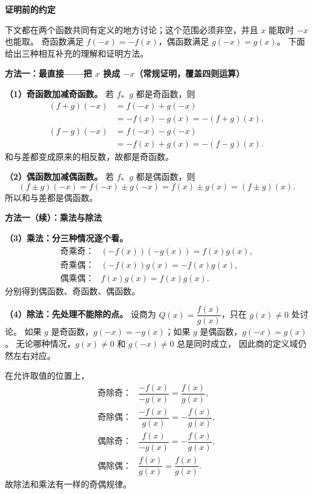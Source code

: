 \clearpage
\begin{proofbox}
\textbf{\textcolor{CProof}{证明前的约定}}

下文都在两个函数共同有定义的地方讨论；这个范围必须非空，并且 $x$ 能取时 $-x$ 也能取。
奇函数满足 $f(-x)=-f(x)$，偶函数满足 $g(-x)=g(x)$。
下面给出三种相互补充的理解和证明方法。

\medskip
\textbf{\textcolor{CProof}{方法一：最直接——把 $x$ 换成 $-x$（常规证明，覆盖四则运算）}}



\textbf{（1）奇函数加减奇函数。}
若 $f$、$g$ 都是奇函数，则
\[
\begin{aligned}
(f+g)(-x)&=f(-x)+g(-x)\\
&=-f(x)-g(x)=-(f+g)(x),\\[1mm]
(f-g)(-x)&=f(-x)-g(-x)\\
&=-f(x)+g(x)=-(f-g)(x).
\end{aligned}
\]
和与差都变成原来的相反数，故都是奇函数。

\textbf{（2）偶函数加减偶函数。}
若 $f$、$g$ 都是偶函数，则
\[
(f\pm g)(-x)=f(-x)\pm g(-x)=f(x)\pm g(x)=(f\pm g)(x).
\]
所以和与差都是偶函数。

\end{proofbox}\clearpage\begin{proofbox}\textbf{方法一（续）：乘法与除法}

\textbf{（3）乘法：分三种情况逐个看。}
\[
\begin{array}{ll}
\text{奇乘奇：}&(-f(x))(-g(x))=f(x)g(x),\\[2mm]
\text{奇乘偶：}&(-f(x))g(x)=-f(x)g(x),\\[2mm]
\text{偶乘偶：}&f(x)g(x)=f(x)g(x).
\end{array}
\]
分别得到偶函数、奇函数、偶函数。

\textbf{（4）除法：先处理不能除的点。}
设商为 $Q(x)=\dfrac{f(x)}{g(x)}$，只在 $g(x)\ne0$ 处讨论。
如果 $g$ 是奇函数，$g(-x)=-g(x)$；如果 $g$ 是偶函数，$g(-x)=g(x)$。
无论哪种情况，$g(x)\ne0$ 和 $g(-x)\ne0$ 总是同时成立，
因此商的定义域仍然左右对应。

在允许取值的位置上，
\[
\begin{array}{ll}
\text{奇除奇：}&\dfrac{-f(x)}{-g(x)}=\dfrac{f(x)}{g(x)},\\[3mm]
\text{奇除偶：}&\dfrac{-f(x)}{g(x)}=-\dfrac{f(x)}{g(x)},\\[3mm]
\text{偶除奇：}&\dfrac{f(x)}{-g(x)}=-\dfrac{f(x)}{g(x)},\\[3mm]
\text{偶除偶：}&\dfrac{f(x)}{g(x)}=\dfrac{f(x)}{g(x)}.
\end{array}
\]
故除法和乘法有一样的奇偶规律。

\medskip

\end{proofbox}
